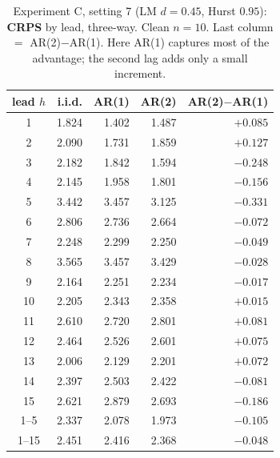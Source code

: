 \documentclass[11pt]{article}
\begin{document}
\begin{table}[ht]
\centering
\caption{Experiment C, setting 7 (LM $d = 0.45$, Hurst $0.95$): \textbf{CRPS}
by lead, three-way. Clean $n = 10$. Last column $=$ AR(2)$-$AR(1). Here AR(1)
captures most of the advantage; the second lag adds only a small increment.}
\label{tab:expC7crps}
\small
\begin{tabular}{crrrr}
\toprule
lead $h$ & i.i.d. & AR(1) & AR(2) & AR(2)$-$AR(1) \\
\midrule
1 & 1.824 & 1.402 & 1.487 & $+0.085$ \\
2 & 2.090 & 1.731 & 1.859 & $+0.127$ \\
3 & 2.182 & 1.842 & 1.594 & $-0.248$ \\
4 & 2.145 & 1.958 & 1.801 & $-0.156$ \\
5 & 3.442 & 3.457 & 3.125 & $-0.331$ \\
6 & 2.806 & 2.736 & 2.664 & $-0.072$ \\
7 & 2.248 & 2.299 & 2.250 & $-0.049$ \\
8 & 3.565 & 3.457 & 3.429 & $-0.028$ \\
9 & 2.164 & 2.251 & 2.234 & $-0.017$ \\
10 & 2.205 & 2.343 & 2.358 & $+0.015$ \\
11 & 2.610 & 2.720 & 2.801 & $+0.081$ \\
12 & 2.464 & 2.526 & 2.601 & $+0.075$ \\
13 & 2.006 & 2.129 & 2.201 & $+0.072$ \\
14 & 2.397 & 2.503 & 2.422 & $-0.081$ \\
15 & 2.621 & 2.879 & 2.693 & $-0.186$ \\
\midrule
1--5 & 2.337 & 2.078 & 1.973 & $-0.105$ \\
1--15 & 2.451 & 2.416 & 2.368 & $-0.048$ \\
\bottomrule
\end{tabular}
\end{table}
\end{document}
